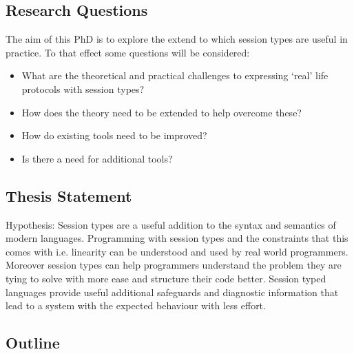 \subsection{Research Questions}


The aim of this PhD is to explore the extend to which session types are useful in practice. To that effect some questions will be considered:

\begin{itemize}

\item What are the theoretical and practical challenges to expressing `real' life protocols with session types?
\item How does the theory need to be extended to help overcome these?
\item How do existing tools need to be improved?
\item Is there a need for additional tools?
\end{itemize}

\subsection{Thesis Statement}
Hypothesis: Session types are a useful addition to the syntax and semantics of modern languages. Programming with session types and the constraints that this comes with i.e. linearity can be understood and used by real world programmers. Moreover session types can help programmers understand the problem they are tying to solve with more ease and structure their code better.
Session typed languages provide useful additional safeguards and diagnostic information that lead to a system with the expected behaviour with less effort.


\subsection{Outline}

